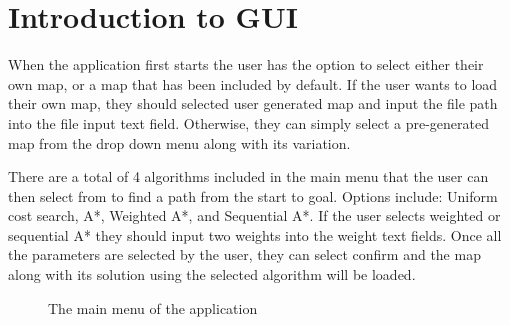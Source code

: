 \section{Introduction to GUI}

When the application first starts the user has the option to select either their own
map, or a map that has been included by default. If the user wants to load their own map, they should selected
user generated map and input the file path into the file input text field. Otherwise, they
can simply select a pre-generated map from the drop down menu along with its variation.

There are a total of 4 algorithms included in the main menu that the user can then select from to find a path
from the start to goal. Options include: Uniform cost search, A*, Weighted A*, and Sequential A*. If the
user selects weighted or sequential A* they should input two weights into the weight text fields. Once all the parameters
are selected by the user, they can select confirm and the map along with its solution using the selected algorithm
will be loaded.


\begin{figure}[H]
	\centering
	\caption{The main menu of the application}
	\label{fig: Main menu}
\end{figure}
